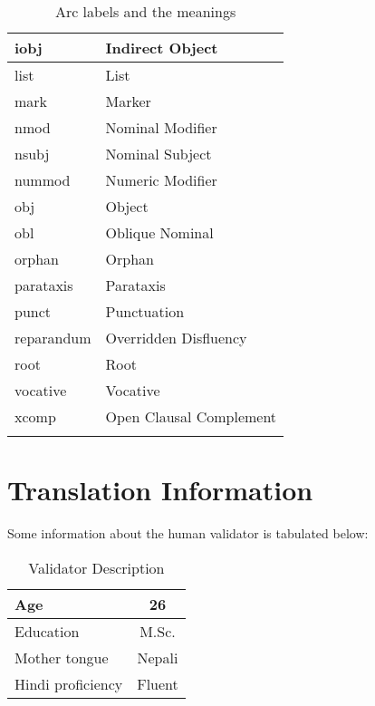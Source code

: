 \begin{longtable}{| p{} | p{} |}
            \hline
            iobj & Indirect Object \\
            \hline
            list & List \\
            \hline
            mark & Marker \\
            \hline
            nmod & Nominal Modifier \\
            \hline
            nsubj & Nominal Subject \\
            \hline
            nummod & Numeric Modifier \\
            \hline
            obj & Object \\
            \hline
            obl & Oblique Nominal \\
            \hline
            orphan & Orphan \\
            \hline
            parataxis & Parataxis \\
            \hline
            punct & Punctuation \\
            \hline
            reparandum & Overridden Disfluency \\
            \hline
            root & Root \\
            \hline
            vocative & Vocative \\
            \hline
            xcomp & Open Clausal Complement \\
            \hline
        \caption{Arc labels and the meanings}
        \label{table:label_meanings}
\end{longtable}

\chapter{Translation Information} \label{translation}
Some information about the human validator is tabulated below:
\begin{table}[ht]
    \begin{center}
        \begin{tabular}{|l|c|}
            \hline
            Age & 26 \\
            \hline
            Education & M.Sc. \\
            \hline
            Mother tongue & Nepali \\
            \hline
            Hindi proficiency & Fluent \\
            \hline
        \end{tabular}
        \caption{Validator Description}
        \label{table:validator_description}
    \end{center}
\end{table}

